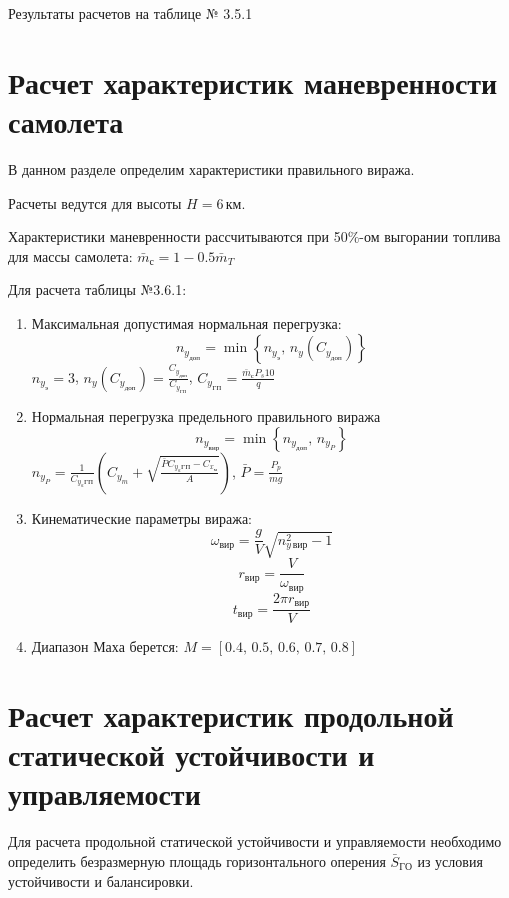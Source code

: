 Результаты расчетов на таблице № 3.5.1

\section{Расчет характеристик маневренности самолета}

В данном разделе определим характеристики правильного виража.

Расчеты ведутся для высоты $H=6\, \text{км}$.

Характеристики маневренности рассчитываются при 50\%-ом выгорании
топлива для массы самолета: $\bar{m}_с = 1 - 0.5 \bar{m}_T$

Для расчета таблицы №3.6.1:
\begin{enumerate}
    \item Максимальная допустимая нормальная перегрузка:
        \[
            n_{y_{доп}}=\min \left\{ n_{y_{э}},\,n_y(C_{y_{доп}}) \right\} 
        \]
        $n_{y_{э}} = 3$, $n_y(C_{y_{доп}}) = \frac{C_{y_{доп}}}{C_{y_{ГП}}}$,
        $C_{y_{ГП}} = \frac{\bar{m}_с P_s 10}{q}$
    \item Нормальная перегрузка предельного правильного виража
        \[
            n_{y_{вир}}=\min \left\{ n_{y_{доп}},\,n_{y_P} \right\} 
        \]
        $n_{y_{P}} = \frac{1}{C_{y_{a}ГП}} \left( C_{y_m} + \sqrt{
        \frac{\bar{P} C_{y_{a}ГП} - C_{x_{м}} }{A}} \right) $, $\bar{P} = \frac{P_p}{mg}$
    \item Кинематические параметры виража:
        \[
            \omega_{вир}  = \frac{g}{V} \sqrt{n_{y\, вир}^2 - 1}
        \]
        \[
            r_{вир} = \frac{V}{\omega_{вир}}
        \]
        \[
            t_{вир} = \frac{2 \pi r_{вир}}{V}
        \]
        \item Диапазон Маха берется:
            $M = [0.4,\, 0.5,\, 0.6,\,0.7,\,0.8]$
\end{enumerate}


\section{Расчет характеристик продольной статической устойчивости и
управляемости}

Для расчета продольной статической устойчивости и управляемости
необходимо определить безразмерную площадь горизонтального оперения
$\bar{S}_{ГО}$ из условия устойчивости и
балансировки.

